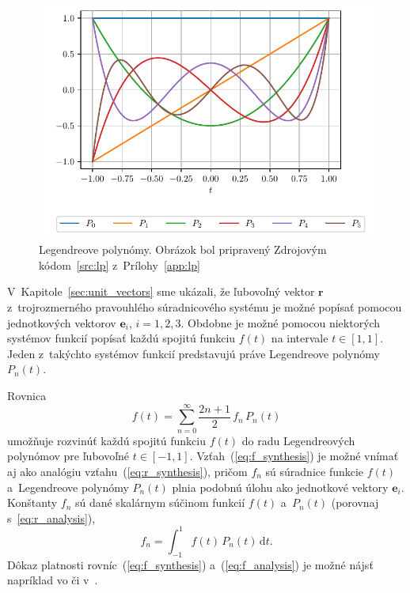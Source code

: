 \documentclass[a4paper, 12pt]{book}
\newcommand{\diff}{\mathrm d}
\let\vec\mathbf
\begin{document}
\begin{figure}[bt]
\label{fig:lp}
\centering
\includegraphics{./fig-legendre-polynomials.pdf}
\caption{Legendreove polynómy.  Obrázok bol pripravený Zdrojovým
kódom~\ref{src:lp} z~Prílohy~\ref{app:lp}}
\end{figure}

V~Kapitole~\ref{sec:unit_vectors} sme ukázali, že ľubovoľný vektor $\vec r$
z~trojrozmerného pravouhlého súradnicového systému je možné popísať pomocou
jednotkových vektorov $\vec e_i$, $i = 1, 2, 3$.  Obdobne je možné pomocou
niektorých systémov funkcií popísať každú spojitú funkciu $f(t)$ na intervale
$t \in [1, 1]$.  Jeden z~takýchto systémov funkcií predstavujú práve
Legendreove polynómy~$P_n(t)$.

Rovnica
%
\begin{equation}
\label{eq:f_synthesis}
f(t) = \sum_{n = 0}^\infty \frac{2n + 1}{2} \, f_n \, P_n(t)
\end{equation}
%
umožňuje rozvinúť každú spojitú funkciu $f(t)$ do radu Legendreových polynómov
pre ľubovoľné $t \in [-1, 1]$.  Vzťah~(\ref{eq:f_synthesis}) je možné vnímať aj
ako analógiu vzťahu~(\ref{eq:r_synthesis}), pričom $f_n$ sú súradnice funkcie
$f(t)$ a~Legendreove polynómy $P_n(t)$ plnia podobnú úlohu ako jednotkové
vektory $\vec e_i$.  Konštanty $f_n$ sú dané skalárnym súčinom funkcií $f(t)$
a~$P_n(t)$ (porovnaj s~\ref{eq:r_analysis}),
%
\begin{equation}
\label{eq:f_analysis}
f_n = \int_{-1}^1 f(t) \, P_n(t) \, \diff t{.}
\end{equation}
%
Dôkaz platnosti rovníc~(\ref{eq:f_synthesis}) a~(\ref{eq:f_analysis}) je možné
nájsť napríklad vo \cite{Freeden2009} či v~\cite{SansoGeoidDetermination}.
\end{document}

